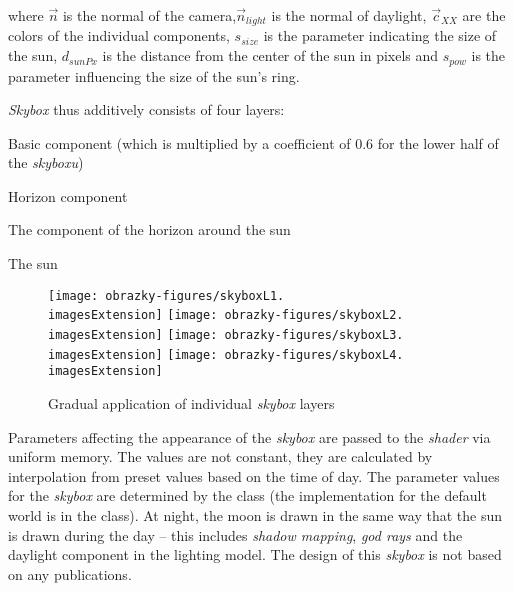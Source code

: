 where $\vec{n}$ is the normal of the camera,$\vec{n}_{light}$ is the normal of daylight, $\vec{c}_{XX}$ are the colors of the individual components, $s_{size}$ is the parameter indicating the size of the sun, $d_{sunPx}$ is the distance from the center of the sun in pixels and $s_{pow}$ is the parameter influencing the size of the sun's ring.

\textit{Skybox} thus additively consists of four layers:
\begin{compactenum}
	\item Basic component (which is multiplied by a coefficient of $0.6$ for the lower half of the \textit{skyboxu})
	\item Horizon component
	\item The component of the horizon around the sun
	\item The sun
\end{compactenum}

\begin{figure}[H]
	\texttt{[image: obrazky-figures/skyboxL1.\\imagesExtension]}
	\hfill
	\texttt{[image: obrazky-figures/skyboxL2.\\imagesExtension]}
	\hfill
	\texttt{[image: obrazky-figures/skyboxL3.\\imagesExtension]}
	\hfill
	\texttt{[image: obrazky-figures/skyboxL4.\\imagesExtension]}
	\caption{Gradual application of individual \textit{skybox} layers}
\end{figure}

Parameters affecting the appearance of the \textit{skybox} are passed to the \textit{shader} via uniform memory. The values are not constant, they are calculated by interpolation from preset values based on the time of day. The parameter values for the \textit{skybox} are determined by the  class (the implementation for the default world is in the  class). At night, the moon is drawn in the same way that the sun is drawn during the day -- this includes \textit{shadow mapping}, \textit{god rays} and the daylight component in the lighting model. The design of this \textit{skybox} is not based on any publications.


\vfill



